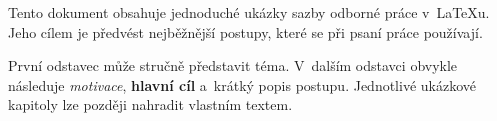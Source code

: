 

Tento dokument obsahuje jednoduché ukázky sazby odborné práce v~LaTeXu.
Jeho cílem je předvést nejběžnější postupy, které se při psaní práce používají.

První odstavec může stručně představit téma. V~dalším odstavci obvykle
následuje \emph{motivace}, \textbf{hlavní cíl} a~krátký popis postupu.
Jednotlivé ukázkové kapitoly lze později nahradit vlastním textem.

